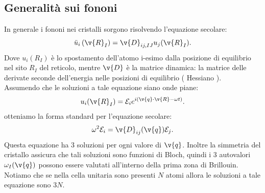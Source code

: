 \subsection{Generalità sui fononi}%
\label{sub:Generalità sui fononi}
In generale i fononi nei cristalli sorgono risolvendo l'equazione secolare:
\[
    \ddot{u}_i\left( \v{R}_I \right) 
    =
    \v{D}_{ij,IJ}u_j(\v{R}_I) 
.\] 
Dove $u_i( R_I )$ è lo spostamento dell'atomo i-esimo dalla posizione di equilibrio nel sito $R_I$ del reticolo, mentre $\v{D}$ è la matrice dinamica: la matrice delle derivate seconde dell'energia nelle posizioni di equilibrio ( Hessiano ).\\
Assumendo che le soluzioni a tale equazione siano onde piane:
\[
    u_i( \v{R}_I ) = \mathcal{E}_i e^{i( \v{q}\cdot\v{R}-\omega t ) }
.\] 
otteniamo la forma standard per l'equazione secolare:
\[
    \omega^2\mathcal{E}_i=\v{D}_{ij}( \v{q} ) \mathcal{E}_j 
.\] 
Questa equazione ha 3 soluzioni per ogni valore di $\v{q}$. Inoltre la simmetria del cristallo assicura che tali soluzioni sono funzioni di Bloch, quindi i 3 autovalori $\omega_I(\v{q})$ possono essere valutati all'interno della prima zona di Brillouin.\\
Notiamo che se nella cella unitaria sono presenti $N$ atomi allora le soluzioni a tale equazione sono $3N$.\\
